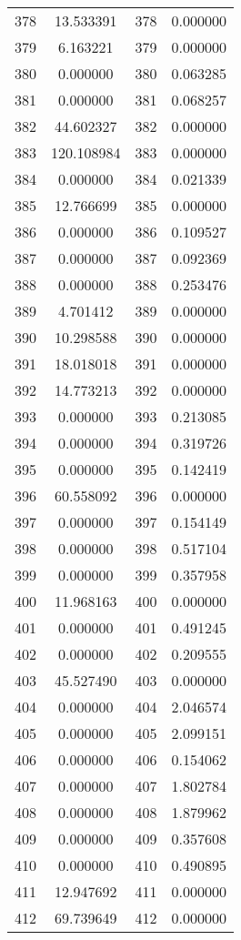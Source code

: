\documentclass[12pt]{article}
\begin{document}
\begin{longtable}{@{}cccc@{}}
378 & 13.533391 & 378 & 0.000000 \\
379 & 6.163221 & 379 & 0.000000 \\
380 & 0.000000 & 380 & 0.063285 \\
381 & 0.000000 & 381 & 0.068257 \\
382 & 44.602327 & 382 & 0.000000 \\
383 & 120.108984 & 383 & 0.000000 \\
384 & 0.000000 & 384 & 0.021339 \\
385 & 12.766699 & 385 & 0.000000 \\
386 & 0.000000 & 386 & 0.109527 \\
387 & 0.000000 & 387 & 0.092369 \\
388 & 0.000000 & 388 & 0.253476 \\
389 & 4.701412 & 389 & 0.000000 \\
390 & 10.298588 & 390 & 0.000000 \\
391 & 18.018018 & 391 & 0.000000 \\
392 & 14.773213 & 392 & 0.000000 \\
393 & 0.000000 & 393 & 0.213085 \\
394 & 0.000000 & 394 & 0.319726 \\
395 & 0.000000 & 395 & 0.142419 \\
396 & 60.558092 & 396 & 0.000000 \\
397 & 0.000000 & 397 & 0.154149 \\
398 & 0.000000 & 398 & 0.517104 \\
399 & 0.000000 & 399 & 0.357958 \\
400 & 11.968163 & 400 & 0.000000 \\
401 & 0.000000 & 401 & 0.491245 \\
402 & 0.000000 & 402 & 0.209555 \\
403 & 45.527490 & 403 & 0.000000 \\
404 & 0.000000 & 404 & 2.046574 \\
405 & 0.000000 & 405 & 2.099151 \\
406 & 0.000000 & 406 & 0.154062 \\
407 & 0.000000 & 407 & 1.802784 \\
408 & 0.000000 & 408 & 1.879962 \\
409 & 0.000000 & 409 & 0.357608 \\
410 & 0.000000 & 410 & 0.490895 \\
411 & 12.947692 & 411 & 0.000000 \\
412 & 69.739649 & 412 & 0.000000 \\

\end{longtable}
\end{document}
